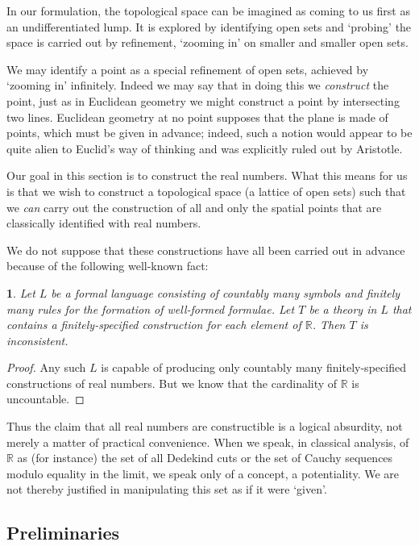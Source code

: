 \documentclass[oneside,english]{amsbook}
\numberwithin{section}{chapter}
\theoremstyle{plain}
\newtheorem{thm}{\protect\theoremname}
\theoremstyle{definition}
\providecommand{\theoremname}{Theorem}
\begin{document}
In our formulation, the topological space can be imagined as coming to us first as an undifferentiated lump. It is explored by identifying open sets and `probing' the space is carried out by refinement, `zooming in' on smaller and smaller open sets.

We may identify a point as a special refinement of open sets, achieved by `zooming in' infinitely. Indeed we may say that in doing this we \emph{construct} the point, just as in Euclidean geometry we might construct a point by intersecting two lines. Euclidean geometry at no point supposes that the plane is made of points, which must be given in advance; indeed, such a notion would appear to be quite alien to Euclid's way of thinking and was explicitly ruled out by Aristotle.

Our goal in this section is to construct the real numbers. What this means for us is that we wish to construct a topological space (a lattice of open sets) such that we \emph{can} carry out the construction of all and only the spatial points that are classically identified with real numbers. 

We do not suppose that these constructions have all been carried out in advance because of the following well-known fact:
\begin{thm}
	Let $L$ be a formal language consisting of countably many symbols and finitely many rules for the formation of well-formed formulae. Let $T$ be a theory in $L$ that contains a finitely-specified construction for each element of $\mathbb{R}$. Then $T$ is inconsistent.
\end{thm}

\begin{proof}
	Any such $L$ is capable of producing only countably many finitely-specified  constructions of real numbers. But we know that the cardinality of $\mathbb{R}$ is uncountable.
\end{proof}

Thus the claim that all real numbers are constructible is a logical absurdity, not merely a matter of practical convenience. When we speak, in classical analysis, of $\mathbb{R}$ as (for instance) the set of all Dedekind cuts or the set of Cauchy sequences modulo equality in the limit, we speak only of a concept, a potentiality. We are not thereby justified in manipulating this set as if it were `given'.

\subsection{Preliminaries}
\end{document}
